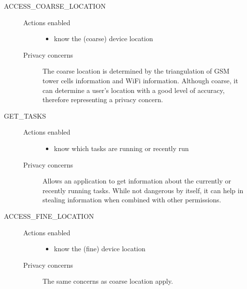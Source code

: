 \begin{description}
    \item[ACCESS\_COARSE\_LOCATION] \hfill
        \begin{description}
             \item[Actions enabled] \hfill
                \begin{itemize}
                    \item know the (coarse) device location
                 \end{itemize} 
             \item[Privacy concerns]
                The coarse location is determined by the triangulation of GSM tower cells information and WiFi information. Although coarse, it can determine a user's location with a good level of accuracy, therefore representing a privacy concern.                
         \end{description}

    \item[GET\_TASKS] \hfill
        \begin{description}
             \item[Actions enabled] \hfill
                \begin{itemize}
                    \item know which tasks are running or recently run
                 \end{itemize} 
             \item[Privacy concerns]
                Allows an application to get information about the currently or recently running tasks. While not dangerous by itself, it can help in stealing information when combined with other permissions.
         \end{description} 

    \item[ACCESS\_FINE\_LOCATION] \hfill
        \begin{description}
             \item[Actions enabled] \hfill
                \begin{itemize}
                    \item know the (fine) device location
                 \end{itemize} 
             \item[Privacy concerns]
                The same concerns as coarse location apply.
         \end{description} 


\end{description}
